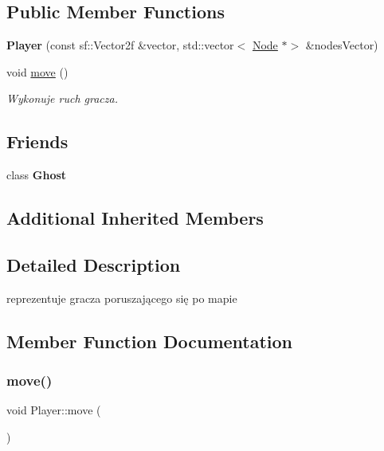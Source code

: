 \subsection*{Public Member Functions}
\begin{DoxyCompactItemize}
\item 
\mbox{\label{classPlayer_a6871bb5e4676deda9e7131715590b755}} 
{\bfseries Player} (const sf\+::\+Vector2f \&vector, std\+::vector$<$ \hyperlink{classNode}{Node} $\ast$$>$ \&nodes\+Vector)
\item 
void \hyperlink{classPlayer_ae02ee46d8c20dd0697b975f935b09839}{move} ()
\begin{DoxyCompactList}\small\item\em Wykonuje ruch gracza. \end{DoxyCompactList}\end{DoxyCompactItemize}
\subsection*{Friends}
\begin{DoxyCompactItemize}
\item 
\mbox{\label{classPlayer_a374118a2c0cb35d1c0fdf7dd8555cda8}} 
class {\bfseries Ghost}
\end{DoxyCompactItemize}
\subsection*{Additional Inherited Members}


\subsection{Detailed Description}
reprezentuje gracza poruszającego się po mapie 

\subsection{Member Function Documentation}
\mbox{\label{classPlayer_ae02ee46d8c20dd0697b975f935b09839}} 
\subsubsection{\texorpdfstring{move()}{move()}}
{\footnotesize\ttfamily void Player\+::move (\begin{DoxyParamCaption}{ }\end{DoxyParamCaption})}



